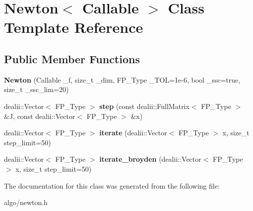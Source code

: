 \hypertarget{classNewton}{}\section{Newton$<$ Callable $>$ Class Template Reference}
\label{classNewton}
\subsection*{Public Member Functions}
\begin{DoxyCompactItemize}
\item 
\mbox{\label{classNewton_a8271deaf4a7dd62152c126fb506b8d9b}} 
{\bfseries Newton} (Callable \+\_\+f, size\+\_\+t \+\_\+dim, F\+P\+\_\+\+Type \+\_\+\+T\+OL=1e-\/6, bool \+\_\+ssc=true, size\+\_\+t \+\_\+ssc\+\_\+lim=20)
\item 
\mbox{\label{classNewton_af1d9bcbab5d492230aa0415c24016640}} 
dealii\+::\+Vector$<$ F\+P\+\_\+\+Type $>$ {\bfseries step} (const dealii\+::\+Full\+Matrix$<$ F\+P\+\_\+\+Type $>$ \&J, const dealii\+::\+Vector$<$ F\+P\+\_\+\+Type $>$ \&x)
\item 
\mbox{\label{classNewton_af8ef9ee70c7f35b08d619b25e5fc2194}} 
dealii\+::\+Vector$<$ F\+P\+\_\+\+Type $>$ {\bfseries iterate} (dealii\+::\+Vector$<$ F\+P\+\_\+\+Type $>$ x, size\+\_\+t step\+\_\+limit=50)
\item 
\mbox{\label{classNewton_a324169685445ba3cda382f05fac41aab}} 
dealii\+::\+Vector$<$ F\+P\+\_\+\+Type $>$ {\bfseries iterate\+\_\+broyden} (dealii\+::\+Vector$<$ F\+P\+\_\+\+Type $>$ x, size\+\_\+t step\+\_\+limit=50)
\end{DoxyCompactItemize}


The documentation for this class was generated from the following file\+:\begin{DoxyCompactItemize}
\item 
algo/newton.\+h\end{DoxyCompactItemize}
